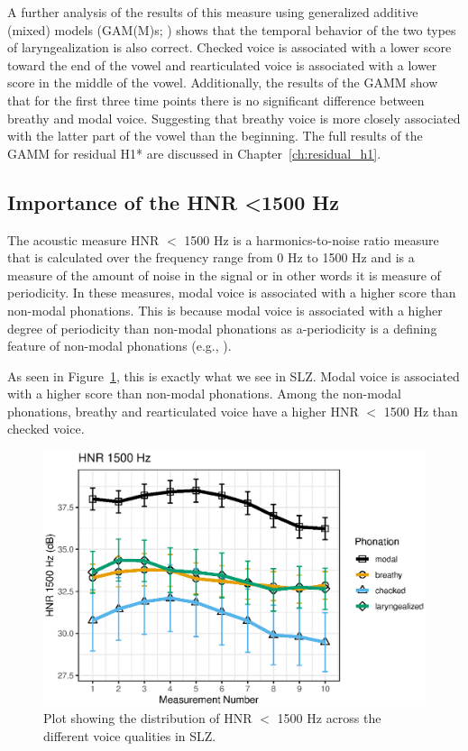 A further analysis of the results of this measure using generalized additive (mixed) models (GAM(M)s; \cite{hastieGeneralizedAdditiveModels1986,woodGeneralizedAdditiveModels2017,soskuthyGeneralisedAdditiveMixed2017,wielingAnalyzingDynamicPhonetic2018}) shows that the temporal behavior of the two types of laryngealization is also correct. Checked voice is associated with a lower score toward the end of the vowel and rearticulated voice is associated with a lower score in the middle of the vowel. Additionally, the results of the GAMM show that for the first three time points there is no significant difference between breathy and modal voice. Suggesting that breathy voice is more closely associated with the latter part of the vowel than the beginning. The full results of the GAMM for residual H1* are discussed in Chapter~\ref{ch:residual_h1}.

\subsection{Importance of the HNR \textless 1500 Hz} \label{sec:bagging_hnr}

The acoustic measure HNR $<$ 1500 Hz is a harmonics-to-noise ratio measure that is calculated over the frequency range from 0 Hz to 1500 Hz and is a measure of the amount of noise in the signal or in other words it is measure of periodicity. In these measures, modal voice is associated with a higher score than non-modal phonations. This is because modal voice is associated with a higher degree of periodicity than non-modal phonations as a-periodicity is a defining feature of non-modal phonations (e.g., \cite{hillenbrandAcousticCorrelatesBreathy1996,blankenshipTimeCourseBreathiness1997,kentVoiceQualityMeasurement1999}).

As seen in Figure~\ref{fig:hnr1500}, this is exactly what we see in SLZ. Modal voice is associated with a higher score than non-modal phonations. Among the non-modal phonations, breathy and rearticulated voice have a higher HNR $<$ 1500 Hz than checked voice. 

\begin{figure}[!ht]
    \centering
    \includegraphics[width = 0.9\linewidth]{images/slz_hnr15.eps}
    \caption{Plot showing the distribution of HNR $<$ 1500 Hz across the different voice qualities in SLZ.}
    \label{fig:hnr1500}
\end{figure}

